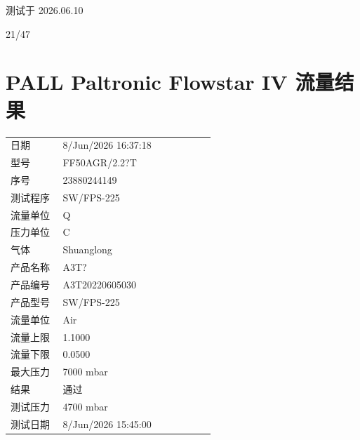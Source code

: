 \documentclass[UTF8,10pt,a4paper,fontset=fandol]{ctexart}
\newcommand{\fieldvalue}[1]{#1}
\newcommand{\handwritten}[1]{#1}
\begin{document}
\handwritten{测试于 2026.06.10}

\handwritten{21/47}

\newpage

\section*{PALL Paltronic Flowstar IV 流量结果}

\begin{tabular}{@{}p{0.24\linewidth}p{0.70\linewidth}@{}}
日期 &
\fieldvalue{8/Jun/2026 16:37:18}
\\
型号 &
\fieldvalue{FF50AGR/2.2?T}
\\
序号 &
\fieldvalue{23880244149}
\\
测试程序 &
\fieldvalue{SW/FPS-225}
\\
流量单位 &
\fieldvalue{Q}
\\
压力单位 &
\fieldvalue{C}
\\
气体 &
\fieldvalue{Shuanglong}
\\
产品名称 &
\fieldvalue{A3T?}
\\
产品编号 &
\fieldvalue{A3T20220605030}
\\
产品型号 &
\fieldvalue{SW/FPS-225}
\\
流量单位 &
\fieldvalue{Air}
\\
流量上限 &
\fieldvalue{1.1000}
\\
流量下限 &
\fieldvalue{0.0500}
\\
最大压力 &
\fieldvalue{7000 mbar}
\\
结果 &
\fieldvalue{通过}
\\
测试压力 &
\fieldvalue{4700 mbar}
\\
测试日期 &
\fieldvalue{8/Jun/2026 15:45:00}
\\
\end{tabular}
\end{document}
